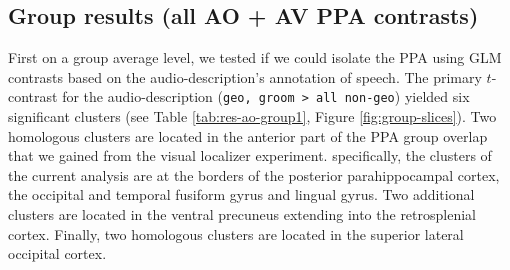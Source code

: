 \documentclass[english]{article}
\begin{document}


\subsection{Group results (all AO + AV PPA contrasts)}




First on a group average level, we tested if we could isolate the PPA using GLM
contrasts based on the audio-description's annotation of speech.
The primary $t$-contrast for the audio-description (\texttt{geo, groom > all
non-geo}) yielded six significant clusters (see Table \ref{tab:res-ao-group1},
Figure \ref{fig:group-slices}).
Two homologous clusters are located in the anterior part of the PPA group
overlap that we gained from the visual localizer experiment.
specifically, the clusters of the current analysis are at the borders of the
posterior parahippocampal cortex, the occipital and temporal fusiform gyrus and
lingual gyrus.
Two additional clusters are located in the ventral precuneus extending into the
retrosplenial cortex.
Finally, two homologous clusters are located in the superior lateral occipital
cortex.
\end{document}
